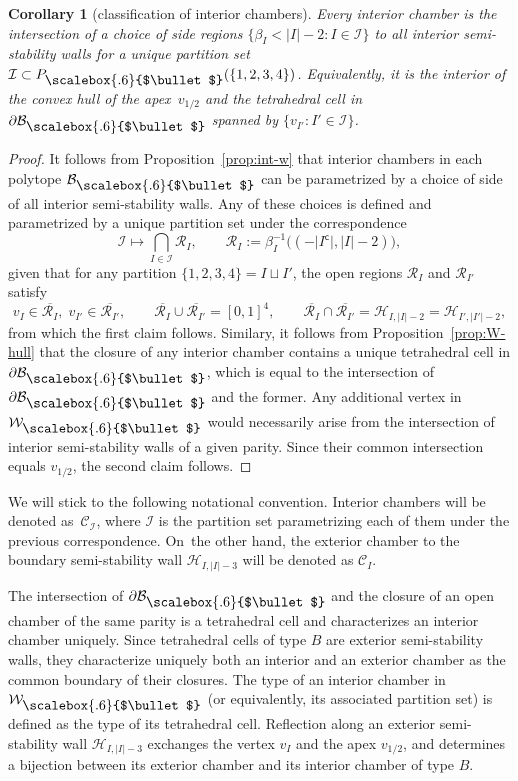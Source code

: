 \documentclass[10pt,a4paper]{amsart}
\newcommand\sbul[1][.6]{\mathbin{\vcenter{\hbox{\scalebox{#1}{$\bullet$}}}}}
\newcommand{\qB}{\mathcal{B}}
\newcommand{\qC}{\mathcal{C}}
\newcommand{\qH}{\mathcal{H}}
\newcommand{\qI}{\mathcal{I}}
\newcommand{\qR}{\mathcal{R}}
\newcommand{\qW}{\mathcal{W}}
\numberwithin{equation}{section}
\newtheorem{Corollary}[Theorem]{Corollary}
\begin{document}
\begin{Corollary}[classification of interior chambers]\label{cor:in-chambers}
Every interior chamber is the intersection of a choice of side regions $\{\beta_{I} < \vert I\vert -2 \colon I\in\qI\}$ to all interior semi-stability walls for a unique partition set $\qI\subset P_{\sbul}(\{1,2,3,4\})$. Equivalently, it is the interior of the convex hull of the apex~$v_{1/2}$ and the tetrahedral cell in $\partial\qB_{\sbul}$ spanned by $\{v_{I'}\colon I'\in\qI\}$.
\end{Corollary}
\begin{proof}
It follows from Proposition~\ref{prop:int-w} that interior chambers in each polytope $\qB_{\sbul}$ can be parametrized by a choice of side of all interior semi-stability walls. Any of these choices is defined and parametrized by a unique partition set under the correspondence
\[
\qI \mapsto \bigcap_{I\in\qI} \qR_{I},\qquad
\qR_{I} := \beta^{-1}_{I}\bigl((-\vert I^{\mathsf{c}}\vert,\vert I\vert -2)\bigr),
\]
given that for any partition $\{1,2,3,4\}=I\sqcup I'$, the open regions $\qR_{I}$ and $\qR_{I'}$ satisfy
\[
v_{I}\in\overline{\qR_{I}},\; v_{I'}\in\overline{\qR_{I'}},\qquad
\overline{\qR_{I}}\cup \overline{\qR_{I'}} =[0,1]^{4},\qquad
\overline{\qR_{I}}\cap \overline{\qR_{I'}} = \qH_{I,\vert I\vert -2} = \qH_{I',\vert I'\vert -2},
\]
from which the first claim follows. Similary, it follows from Proposition~\ref{prop:W-hull} that the closure of any interior chamber contains a unique tetrahedral cell in $\partial\qB_{\sbul}$, which is equal to the intersection of $\partial\qB_{\sbul}$ and the former. Any additional vertex in $\qW_{\sbul}$ would necessarily arise from the intersection of interior semi-stability walls of a given parity. Since their common intersection equals $v_{1/2}$, the second claim follows.
\end{proof}

We will stick to the following notational convention. Interior chambers will be denoted as~$\qC_{\qI}$, where $\qI$ is the partition set parametrizing each of them under the previous correspondence. On~the other hand, the exterior chamber to the boundary semi-stability wall $\qH_{I,\vert I\vert - 3}$ will be denoted as $\qC_{I}$.

The intersection of $\partial \qB_{\sbul}$ and the closure of an open chamber of the same parity is a tetrahedral cell and characterizes an interior chamber uniquely. Since tetrahedral cells of type $B$ are exterior semi-stability walls, they characterize uniquely both an interior and an exterior chamber as the common boundary of their closures. The type of an interior chamber in $\qW_{\sbul}$ (or equivalently, its associated partition set) is defined as the type of its tetrahedral cell. Reflection along an exterior semi-stability wall $\qH_{I,\vert I\vert - 3}$ exchanges the vertex $v_{I}$ and the apex $v_{1/2}$, and determines a bijection between its exterior chamber and its interior chamber of type $B$.
\end{document}
